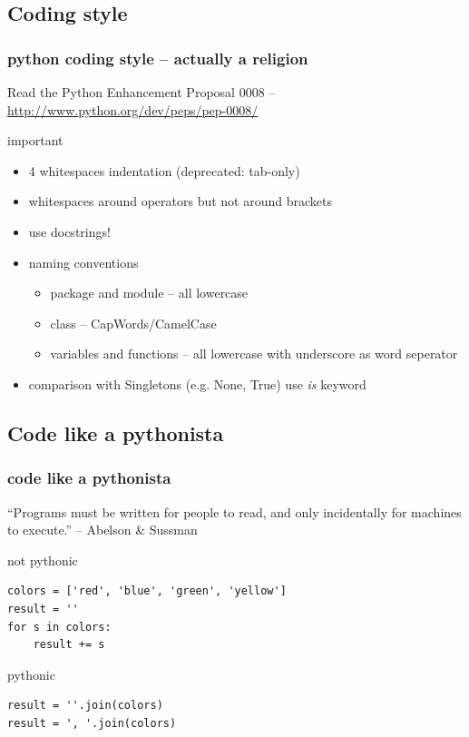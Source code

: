 \documentclass{beamer}
\begin{document}
\subsection{Coding style}
\begin{frame}[fragile]
	\frametitle{python coding style -- actually a religion}
	Read the Python Enhancement Proposal 0008 -- \url{http://www.python.org/dev/peps/pep-0008/}
	\begin{block}{important}
	\begin{itemize}
	\item 4 whitespaces indentation (deprecated: tab-only)
	\item whitespaces around operators but not around brackets
	\item use docstrings!
	\item naming conventions
		\begin{itemize}
		\item package and module -- all lowercase
		\item class -- CapWords/CamelCase
		\item variables and functions -- all lowercase with underscore as word seperator
		\end{itemize}
	\item comparison with Singletons (e.g. None, True) use \emph{is} keyword
	\end{itemize}
	\end{block}

\end{frame}

\subsection{Code like a pythonista} 
\begin{frame}[fragile]
	\frametitle{code like a pythonista}
    ``Programs must be written for people to read, and only incidentally for machines to execute.'' -- Abelson \& Sussman\\
	\pause    
    
    \begin{alertblock}{not pythonic}
    \begin{lstlisting}
colors = ['red', 'blue', 'green', 'yellow']
result = ''
for s in colors:
    result += s
    \end{lstlisting}
    \end{alertblock}
  	\pause
    \begin{exampleblock}{pythonic}
    \begin{lstlisting}
result = ''.join(colors)
result = ', '.join(colors)
    \end{lstlisting}
    \end{exampleblock}
\end{frame}
\end{document}
